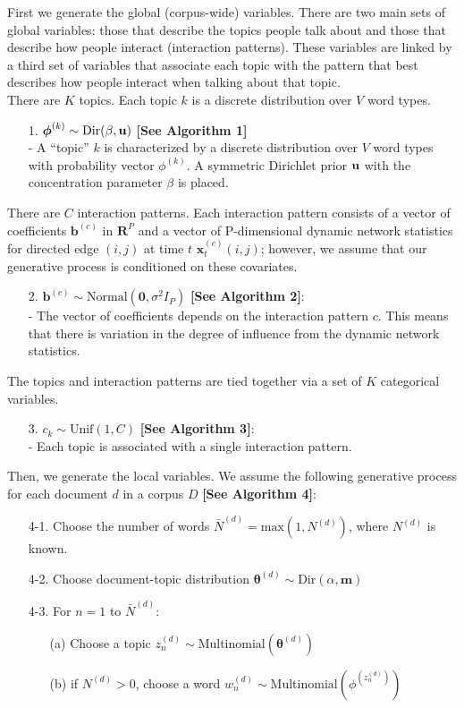 \documentclass[a4paper]{article}
\begin{document}
First we generate the global (corpus-wide) variables. There are two main sets of global variables:
those that describe the topics people talk about and those that describe how people interact (interaction patterns). These variables are linked by a third set of variables that associate each topic with the pattern that best describes how people interact when talking about that topic.\\ \newline
There are $K$ topics. Each topic $k$ is a discrete distribution over $V$ word types.
\begin{itemize}
	\item[1.] {$\boldsymbol{\phi}^{(k)} \sim \mbox{Dir}(\beta, \bf u)$} \textbf{[See Algorithm 1]}\\
	- A “topic” $k$ is characterized by a discrete distribution over $V$ word types with probability vector $\phi^{(k)}$. A symmetric Dirichlet prior $\bf u$ with the concentration parameter $\beta$ is placed.
\end{itemize}
\noindent There are $C$ interaction patterns. Each interaction pattern consists of a vector of coefficients $\boldsymbol{b}^{(c)}$ in $\boldsymbol{R}^{P}$ and a vector of P-dimensional dynamic network statistics for directed edge $(i, j)$ at time $t$ $\boldsymbol{x}^{(c)}_t(i, j)$; however, we assume that our generative process is conditioned on these covariates. 
\begin{itemize}
	\item[2.] $\boldsymbol{b}^{(c)}\sim \mbox{Normal}(\textbf{0}, \sigma^2I_P)$ \textbf{[See Algorithm 2]}: \\
		- The vector of coefficients depends on the interaction pattern $c$. This means that there is variation in the degree of influence from the dynamic network statistics.
	\end{itemize}
\noindent The topics and interaction patterns are tied together via a set of $K$ categorical variables.
\begin{itemize}
	\item[3.] $c_k\sim \mbox{Unif}(1, C)$ \textbf{[See Algorithm 3]}: \\
	- Each topic is associated with a single interaction pattern.\\
\end{itemize}
\noindent Then, we generate the local variables. We assume the following generative process for each document $d$ in a corpus $D$ \textbf{[See Algorithm 4]}:
\begin{itemize}
	\item[4-1.] Choose the number of words $\bar N^{(d)} = \mbox{max}(1,  N^{(d)})$, where $N^{(d)}$ is known.
	\item[4-2.] Choose document-topic distribution $\boldsymbol{\theta}^{(d)}\sim \mbox{Dir}(\alpha, \boldsymbol{m})$
	\item[4-3.] For $n=1$ to $\bar N^{(d)}$:
	\begin{itemize}
		\item[(a)] Choose a topic $z_n^{(d)} \sim \mbox{Multinomial}(\boldsymbol{\theta}^{(d)})$
		\item[(b)] if $N^{(d)}>0$, choose a word $w_n^{(d)} \sim\mbox{Multinomial} (\phi^{(z_n^{(d)})})$
	\end{itemize}
\end{itemize}
\end{document}
